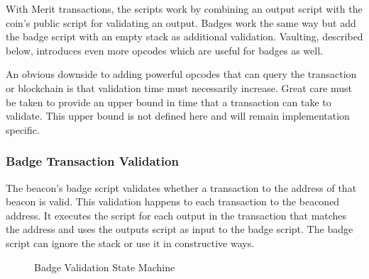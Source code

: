 \documentclass{article}
\begin{document}
\begin{center}
\end{center}

With Merit transactions, the scripts work by combining an output script with the
coin's public script for validating an output. Badges work the same way but add
the badge script with an empty stack as additional validation. Vaulting, described
below, introduces even more opcodes which are useful for badges as well.

An obvious downside to adding powerful opcodes that can query the transaction or
blockchain is that validation time must necessarily increase. Great care must
be taken to provide an upper bound in time that a transaction can take to validate.
This upper bound is not defined here and will remain implementation specific. 

\subsubsection{Badge Transaction Validation}

The beacon's badge script validates whether a transaction to the address of that
beacon is valid. This validation happens to each transaction to the beaconed address.
It executes the script for each output in the transaction that matches the address
and uses the outputs script as input to the badge script. The badge script can
ignore the stack or use it in constructive ways.

\begin{figure}[H]
    \begin{center}
    \end{center}
    \caption{Badge Validation State Machine}
\end{figure}
\end{document}
